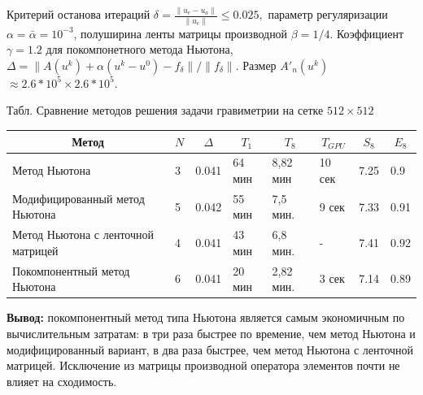\documentclass[10pt,pdf, mathserif, hyperref={unicode}]{beamer}
\begin{document}
\begin{frame}
	Критерий останова итераций 
	$\delta=\frac{\|u_e-u_a\|}{\|u_e\|}\leqslant 0.025,$ параметр регуляризации $\alpha=\bar{\alpha}=10^{-3}$, полуширина ленты матрицы производной $\beta=1/4$. Коэффициент $\gamma=1.2$ для покомпонетного метода Ньютона, $\Delta=\|A(u^k)+\alpha(u^k-u^0)-f_\delta\|/\|f_\delta\|$. Размер $A'_n(u^k)$  $\approx 2.6*10^5\times2.6*10^5$.
	
	\begin{table}[]
		\centering
		\renewcommand{\arraystretch}{1.5}
		\scriptsize{Табл. Сравнение методов решения задачи гравиметрии на сетке $512\times512$}
		\label{table3.1}
		\begin{tabular}{|p{}|l|l|l|l|l|l|l|}
			\hline
			\multicolumn{1}{|c|}{Метод}        & \multicolumn{1}{c|}{$N$} &
			\multicolumn{1}{c|}{$\Delta$} & \multicolumn{1}{c|}{$T_1$} & \multicolumn{1}{c|}{$T_8$} &
			\multicolumn{1}{c|}{$T_{GPU}$} &
			\multicolumn{1}{c|}{$S_8$} & \multicolumn{1}{c|}{$E_8$}
			\\ \hline
			Метод Ньютона                      &  3        & 0.041                          &       64 мин                  &     8,82 мин &
			10 сек & 7.25 & 0.9 \\ \hline
			Модифицированный метод Ньютона     &         5           & 0.042            & 55 мин                  & 7,5 мин.    &
			9 сек & 7.33 & 0.91             \\ \hline
			Метод Ньютона с ленточной матрицей &  4               & 0.041                    & 43 мин                  & 6,8 мин. & -   & 7.41 & 0.92            \\ \hline
			\rowcolor{Green}
			Покомпонентный метод Ньютона &  6               & 0.041                    & 20 мин  & 2,82 мин.  &  3 сек   & 7.14 & 0.89            \\ \hline
		\end{tabular}
	\end{table}
	\textbf{\color{blue}Вывод:} покомпонентный метод типа Ньютона является самым экономичным по вычислительным затратам: в три раза быстрее по времение, чем метод Ньютона и модифицированный вариант, в два раза быстрее, чем метод Ньютона с ленточной матрицей. Исключение из матрицы производной оператора элементов почти не влияет на сходимость. 
\end{frame}
\end{document}
